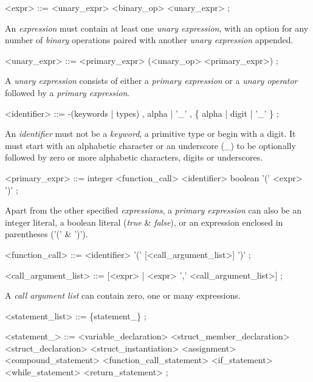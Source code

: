 \documentclass{article}
\begin{document}
\begin{grammar}
<expr> ::=
    <unary\_expr> {<binary\_op> <unary\_expr>}
    ;
\end{grammar}
An \textit{expression} must contain at least one \textit{unary expression}, with an option for any number of \textit{binary} operations paired with another \textit{unary expression} appended.
\begin{grammar}
<unary\_expr> ::=
	<primary\_expr>
    \alt (<unary\_op> <primary\_expr>)
    ;
\end{grammar}
A \textit{unary expression} consists of either a \textit{primary expression} or a \textit{unary operator} followed by a \textit{primary expression}.
\begin{grammar}
<identifier> ::=
	-(keywords | types) ,
	alpha | '\_' , \{ alpha | digit | '\_' \} ;
\end{grammar}
An \textit{identifier} must not be a \textit{keyword}, a primitive type or begin with a digit. It must start with an alphabetic character or an underscore (\_) to be optionally followed by zero or more alphabetic characters, digits or underscores. 
\begin{grammar}
<primary\_expr> ::=
	integer
    \alt   <function\_call>
    \alt   <identifier>
    \alt   boolean
    \alt   '(' <expr> ')'
;
\end{grammar}
Apart from the other specified \textit{expressions}, a \textit{primary expression} can also be an integer literal, a boolean literal (\textit{true} \& \textit{false}), or an expression enclosed in parentheses ('(' \& ')').
\begin{grammar}
<function\_call> ::=
<identifier> '(' [<call_argument_list>] ')'
;
\end{grammar}
\begin{grammar}
<call_argument\_list> ::= [<expr> | <expr> ',' <call_argument_list>] ;
\end{grammar}
A \textit{call argument list} can contain zero, one or many expressions.
\begin{grammar}
<statement_list> ::=
    \{statement_\}
    ;
\end{grammar}
\begin{grammar}
<statement_> ::=
	<variable_declaration>
    \alt   <struct_member_declaration>
    \alt   <struct_declaration>
    \alt   <struct_instantiation>
    \alt   <assignment>
    \alt   <compound_statement>
    \alt   <function_call_statement>
    \alt   <if_statement>
    \alt   <while_statement>
    \alt   <return_statement>
    ;
\end{grammar}
\end{document}
